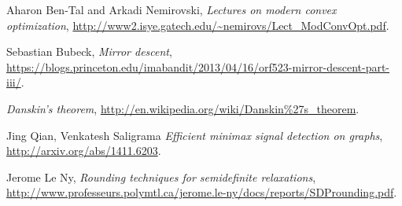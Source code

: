 \documentclass{article}
\begin{document}
% 




\begin{thebibliography}{9}

  Aharon Ben-Tal and Arkadi Nemirovski,
  \emph{Lectures on modern convex optimization},
  \url{http://www2.isye.gatech.edu/~nemirovs/Lect_ModConvOpt.pdf}.

  Sebastian Bubeck,
  \emph{Mirror descent},
  \url{https://blogs.princeton.edu/imabandit/2013/04/16/orf523-mirror-descent-part-iii/}.

  \emph{Danskin's theorem},
  \url{http://en.wikipedia.org/wiki/Danskin\%27s_theorem}.

  Jing Qian, Venkatesh Saligrama
  \emph{Efficient minimax signal detection on graphs},
  \url{http://arxiv.org/abs/1411.6203}.

  Jerome Le Ny,
  \emph{Rounding techniques for semidefinite relaxations},
  \url{http://www.professeurs.polymtl.ca/jerome.le-ny/docs/reports/SDProunding.pdf}.
\end{thebibliography}
\end{document}
